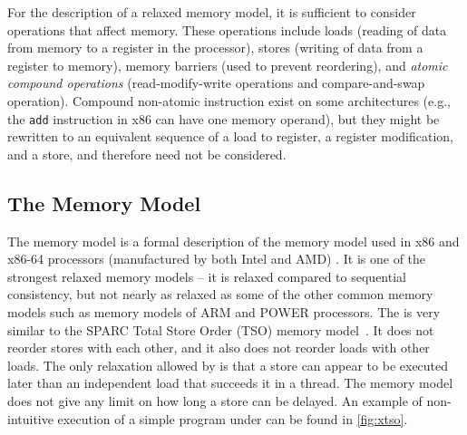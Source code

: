 For the description of a relaxed memory model, it is sufficient to consider
operations that affect memory.
These operations include loads (reading of data from memory to a register
in the processor), stores (writing of data from a register to memory),
memory barriers (used to prevent reordering), and \emph{atomic compound
operations} (read-modify-write operations and compare-and-swap operation).
Compound non-atomic instruction exist on some architectures (e.g., the
\texttt{add} instruction in x86 can have one memory operand), but they
might be rewritten to an equivalent sequence of a load to register, a register
modification, and a store, and therefore need not be considered.

\subsection{The \xtso Memory Model\protect\mnotemark}\label{chap:prelim:xtso}%

The \xtso memory model is a formal description of the memory model used in x86
and x86-64 processors (manufactured by both Intel and AMD) .
It is one of the strongest relaxed memory models -- it is relaxed compared to
sequential consistency, but not nearly as relaxed as some of the other common
memory models such as memory models of ARM and POWER processors.
The \xtso is very similar to the SPARC Total Store Order (TSO) memory
model~.
It does not reorder stores with each other, and it also does not reorder loads
with other loads.
The only relaxation allowed by \xtso is that a store can appear to be executed
later than an independent load that succeeds it in a thread.
The memory model does not give any limit on how long a store can be delayed.
An example of non-intuitive execution of a simple program under \xtso can be
found in \autoref{fig:xtso}.

